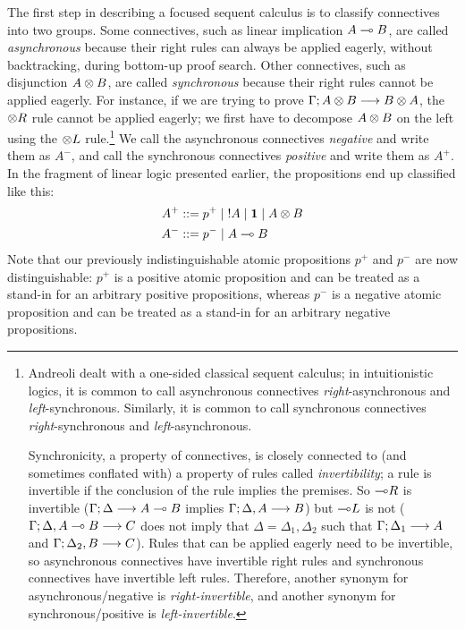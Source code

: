 The first step in describing a focused sequent calculus is to classify
connectives into two groups.  Some connectives, such as linear
implication $A \multimap B$, are called {\it asynchronous} because their
right rules can always be applied eagerly, without backtracking,
during bottom-up proof search. Other connectives, such as disjunction
$A \otimes B$, are called {\it synchronous} because their right rules
cannot be applied eagerly. For instance, if we are trying to prove
${\Gamma};{A \otimes B} \longrightarrow {B \otimes A} \mathstrut$, the ${\otimes}R$ rule cannot
be applied eagerly; we first have to decompose $A \otimes B$ on the
left using the ${\otimes}L$ rule.\footnote{Andreoli dealt with a
  one-sided classical sequent calculus; in intuitionistic logics, it
  is common to call asynchronous connectives {\it right}-asynchronous
  and {\it left}-synchronous. Similarly, it is common to call
  synchronous connectives {\it right}-synchronous and {\it
    left}-asynchronous.

  Synchronicity, a property of connectives, is closely connected to
  (and sometimes conflated with) a property of rules called {\it
    invertibility}; a rule is invertible if the conclusion of the rule
  implies the premises. So ${\multimap}R$ is invertible
  (${\Gamma};{\Delta} \longrightarrow {A \multimap B} \mathstrut$ implies ${\Gamma};{\Delta,
    A} \longrightarrow {B} \mathstrut$) but ${\multimap}L$ is not (${\Gamma};{\Delta, A \multimap
    B} \longrightarrow {C} \mathstrut$ does not imply that $\Delta = \Delta_1, \Delta_2$ such that
  ${\Gamma};{\Delta_1} \longrightarrow {A} \mathstrut$ and ${\Gamma};{\Delta_2, B} \longrightarrow {C} \mathstrut$).
  Rules that can be applied eagerly need to be invertible, so
  asynchronous connectives have invertible right rules and synchronous
  connectives have invertible left rules. Therefore, another synonym
  for asynchronous/negative is {\it right-invertible}, and another
  synonym for synchronous/positive is {\it left-invertible}.}  We call
the asynchronous connectives {\it negative} and write them as $A^-$,
and call the synchronous connectives {\it positive} and write them as
$A^+$. In the fragment of linear logic presented earlier, the
propositions end up classified like this:
\begin{align*}
A^+ & ::= p^+ \mid {!}A \mid \mathbf{1} \mid A \otimes B\\
A^- & ::= p^- \mid A \multimap B
\end{align*}
Note that our previously indistinguishable atomic propositions $p^+$
and $p^-$ are now distinguishable: $p^+$ is a positive atomic proposition and 
can be treated as a stand-in for an arbitrary positive propositions,
whereas $p^-$ is a negative atomic proposition and can be treated 
as a stand-in for an arbitrary negative propositions.

